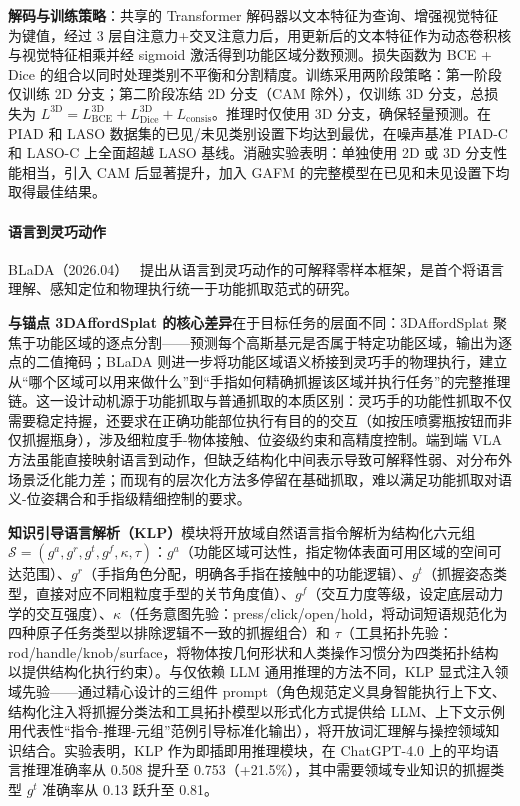\textbf{解码与训练策略}：共享的 Transformer 解码器以文本特征为查询、增强视觉特征为键值，经过 3 层自注意力+交叉注意力后，用更新后的文本特征作为动态卷积核与视觉特征相乘并经 sigmoid 激活得到功能区域分数预测。损失函数为 BCE + Dice 的组合以同时处理类别不平衡和分割精度。训练采用两阶段策略：第一阶段仅训练 2D 分支；第二阶段冻结 2D 分支（CAM 除外），仅训练 3D 分支，总损失为 $L^\text{3D} = L_\text{BCE}^\text{3D} + L_\text{Dice}^\text{3D} + L_\text{consis}$。推理时仅使用 3D 分支，确保轻量预测。在 PIAD 和 LASO 数据集的已见/未见类别设置下均达到最优，在噪声基准 PIAD-C 和 LASO-C 上全面超越 LASO 基线。消融实验表明：单独使用 2D 或 3D 分支性能相当，引入 CAM 后显著提升，加入 GAFM 的完整模型在已见和未见设置下均取得最佳结果。

\paragraph{语言到灵巧动作}

BLaDA（2026.04）~\cite{2604_08410} 提出从语言到灵巧动作的可解释零样本框架，是首个将语言理解、感知定位和物理执行统一于功能抓取范式的研究。

\textbf{与锚点 3DAffordSplat 的核心差异}在于目标任务的层面不同：3DAffordSplat 聚焦于功能区域的逐点分割——预测每个高斯基元是否属于特定功能区域，输出为逐点的二值掩码；BLaDA 则进一步将功能区域语义桥接到灵巧手的物理执行，建立从``哪个区域可以用来做什么''到``手指如何精确抓握该区域并执行任务''的完整推理链。这一设计动机源于功能抓取与普通抓取的本质区别：灵巧手的功能性抓取不仅需要稳定持握，还要求在正确功能部位执行有目的的交互（如按压喷雾瓶按钮而非仅抓握瓶身），涉及细粒度手-物体接触、位姿级约束和高精度控制。端到端 VLA 方法虽能直接映射语言到动作，但缺乏结构化中间表示导致可解释性弱、对分布外场景泛化能力差；而现有的层次化方法多停留在基础抓取，难以满足功能抓取对语义-位姿耦合和手指级精细控制的要求。

\textbf{知识引导语言解析（KLP）}模块将开放域自然语言指令解析为结构化六元组 $\mathcal{S} = (g^a, g^r, g^t, g^f, \kappa, \tau)$：$g^a$（功能区域可达性，指定物体表面可用区域的空间可达范围）、$g^r$（手指角色分配，明确各手指在接触中的功能逻辑）、$g^t$（抓握姿态类型，直接对应不同粗粒度手型的关节角度值）、$g^f$（交互力度等级，设定底层动力学的交互强度）、$\kappa$（任务意图先验：press/click/open/hold，将动词短语规范化为四种原子任务类型以排除逻辑不一致的抓握组合）和 $\tau$（工具拓扑先验：rod/handle/knob/surface，将物体按几何形状和人类操作习惯分为四类拓扑结构以提供结构化执行约束）。与仅依赖 LLM 通用推理的方法不同，KLP 显式注入领域先验——通过精心设计的三组件 prompt（角色规范定义具身智能执行上下文、结构化注入将抓握分类法和工具拓扑模型以形式化方式提供给 LLM、上下文示例用代表性``指令-推理-元组''范例引导标准化输出），将开放词汇理解与操控领域知识结合。实验表明，KLP 作为即插即用推理模块，在 ChatGPT-4.0 上的平均语言推理准确率从 0.508 提升至 0.753（+21.5\%），其中需要领域专业知识的抓握类型 $g^t$ 准确率从 0.13 跃升至 0.81。

